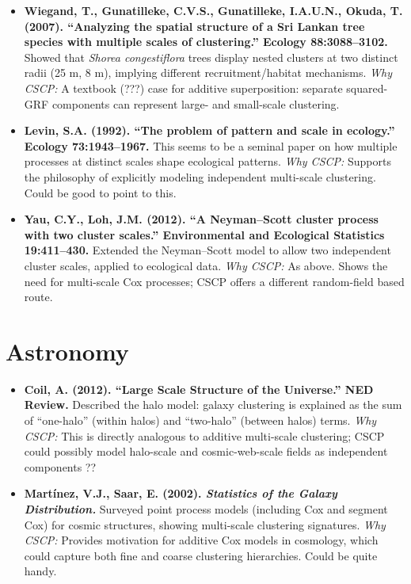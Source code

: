 \documentclass[11pt]{article}
\begin{document}
	\begin{itemize}
		\item \textbf{Wiegand, T., Gunatilleke, C.V.S., Gunatilleke, I.A.U.N., Okuda, T. (2007). ``Analyzing the spatial structure of a Sri Lankan tree species with multiple scales of clustering.'' Ecology 88:3088--3102.}  
		Showed that \emph{Shorea congestiflora} trees display nested clusters at two distinct radii (25 m, 8 m), implying different recruitment/habitat mechanisms.  
		\emph{Why CSCP:} A textbook (???) case for additive superposition: separate squared-GRF components can represent large- and small-scale clustering.
		
		\item \textbf{Levin, S.A. (1992). ``The problem of pattern and scale in ecology.'' Ecology 73:1943--1967.}  
		This seems to be a seminal paper on how multiple processes at distinct scales shape ecological patterns.  
		\emph{Why CSCP:} Supports the philosophy of explicitly modeling independent multi-scale clustering. Could be good to point to this.
		
		\item \textbf{Yau, C.Y., Loh, J.M. (2012). ``A Neyman–Scott cluster process with two cluster scales.'' Environmental and Ecological Statistics 19:411--430.}  
		Extended the Neyman–Scott model to allow two independent cluster scales, applied to ecological data.  
		\emph{Why CSCP:} As above. Shows the need for multi-scale Cox processes; CSCP offers a different random-field based route.
	\end{itemize}
	
	\section*{Astronomy}
	
	\begin{itemize}
		\item \textbf{Coil, A. (2012). ``Large Scale Structure of the Universe.'' NED Review.}  
		Described the halo model: galaxy clustering is explained as the sum of ``one-halo'' (within halos) and ``two-halo'' (between halos) terms.  
		\emph{Why CSCP:} This is directly analogous to additive multi-scale clustering; CSCP could possibly model halo-scale and cosmic-web-scale fields as independent components   ??
		
		\item \textbf{Martínez, V.J., Saar, E. (2002). \emph{Statistics of the Galaxy Distribution.}}  
		Surveyed point process models (including Cox and segment Cox) for cosmic structures, showing multi-scale clustering signatures.  
		\emph{Why CSCP:} Provides motivation for additive Cox models in cosmology, which could capture both fine and coarse clustering hierarchies. Could be quite handy.
	\end{itemize}
	
\end{document}
